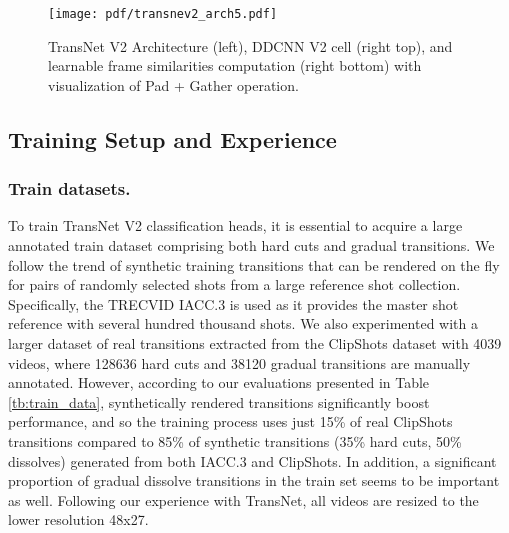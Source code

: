 \documentclass[sigconf]{acmart}
\begin{document}
\begin{figure}
    \centering
    \texttt{[image: pdf/transnev2\_arch5.pdf]}
    \caption{TransNet V2 Architecture (left), DDCNN V2 cell (right top), and learnable frame similarities computation (right bottom) with visualization of Pad + Gather operation.}
    \label{fig:transnetv2_architecture}
\end{figure}

\subsection{Training Setup and Experience}
\subsubsection{Train datasets.}
To train TransNet V2 classification heads, it is essential to acquire a large annotated train dataset comprising both hard cuts and gradual transitions. We follow the trend of synthetic training transitions \cite{HassanienESHM17,Gygli17} that can be rendered on the fly for pairs of randomly selected shots from a large reference shot collection. Specifically, the TRECVID IACC.3 \cite{2017trecvidawad} is used as it provides the master shot reference with several hundred thousand shots. We also experimented with a larger dataset of real transitions extracted from the ClipShots dataset \cite{Tang2018clipshots} with 4039 videos, where 128636 hard cuts and 38120 gradual transitions are manually annotated. However, according to our evaluations presented in Table \ref{tb:train_data}, synthetically rendered transitions significantly boost performance, and so the training process uses just 15\% of real ClipShots transitions compared to 85\% of synthetic transitions (35\% hard cuts, 50\% dissolves) generated from both IACC.3 and ClipShots. In addition, a significant proportion of gradual dissolve transitions in the train set seems to be important as well. Following our experience with TransNet, all videos are resized to the lower resolution 48x27.
\end{document}
